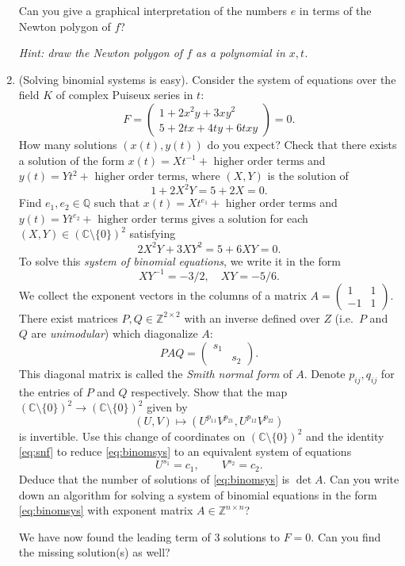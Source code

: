 \documentclass[11pt,reqno]{amsart}
\theoremstyle{definition}
\theoremstyle{remark}
\numberwithin{equation}{section}
\begin{document}
\begin{enumerate}
Can you give a graphical interpretation of the numbers $e$ in terms of the Newton polygon of $f$?

\textit{Hint: draw the Newton polygon of $f$ as a polynomial in $x,t$. }


\item (Solving binomial systems is easy).
Consider the system of equations over the field $K$ of complex Puiseux series in $t$:
$$
F = \begin{pmatrix} 1 + 2 x^2 y + 3 xy^2  \\
5 + 2 tx  + 4 ty + 6 txy \end{pmatrix} = 0.
$$
How many solutions $(x(t),y(t))$ do you expect? Check that there exists a solution of the form $x(t) = X t^{-1} + \text{ higher order terms}$ and $y(t) = Y t^2 + \text{ higher order terms}$, where $(X,Y)$ is the solution of
$$ 1 + 2 X^2Y = 5 + 2X = 0 .$$
Find $e_1, e_2 \in \mathbb{Q}$ such that $x(t) = X t^{e_1} +  \text{ higher order terms}$ and $y(t) = Y t^{e_2} + \text{ higher order terms}$ gives a solution for each $(X,Y) \in (\mathbb{C} \setminus \{0\})^2$ satisfying
$$ 2 X^2 Y + 3 XY^2 = 5 + 6 XY = 0.$$
To solve this \emph{system of binomial equations}, we write it in the form
\begin{equation} \label{eq:binomsys}
XY^{-1} = -3/2, \quad XY = -5/6.
\end{equation}
We collect the exponent vectors in the columns of a matrix $A = \begin{pmatrix}
1 & 1 \\ -1 & 1
\end{pmatrix}$. There exist matrices $P, Q \in \mathbb{Z}^{2 \times 2}$ with an inverse defined over $Z$ (i.e.~$P$ and $Q$ are \emph{unimodular}) which diagonalize $A$:
\begin{equation} \label{eq:snf}
P A Q = \begin{pmatrix}
s_1 & \\
& s_2
\end{pmatrix}.
\end{equation}
This diagonal matrix is called the \emph{Smith normal form} of $A$. Denote $p_{ij}, q_{ij}$ for the entries of $P$ and $Q$ respectively. Show that the map $ (\mathbb{C} \setminus \{0\})^2 \rightarrow (\mathbb{C} \setminus \{0\})^2 $ given by
$$ (U,V) \mapsto (U^{p_{11}} V^{p_{21}}, U^{p_{12}} V^{p_{22}})$$
is invertible. Use this change of coordinates on $(\mathbb{C} \setminus \{0\})^2$ and the identity \eqref{eq:snf} to reduce \eqref{eq:binomsys} to an equivalent system of equations
$$ U^{s_1} = c_1, \qquad V^{s_2} = c_2.$$
Deduce that the number of solutions of \eqref{eq:binomsys} is $\det A$. Can you write down an algorithm for solving a system of binomial equations in the form \eqref{eq:binomsys} with exponent matrix $A \in \mathbb{Z}^{n \times n}$?

We have now found the leading term of 3 solutions to $F = 0$. Can you find the missing solution(s) as well?
\end{enumerate}
\end{document}
